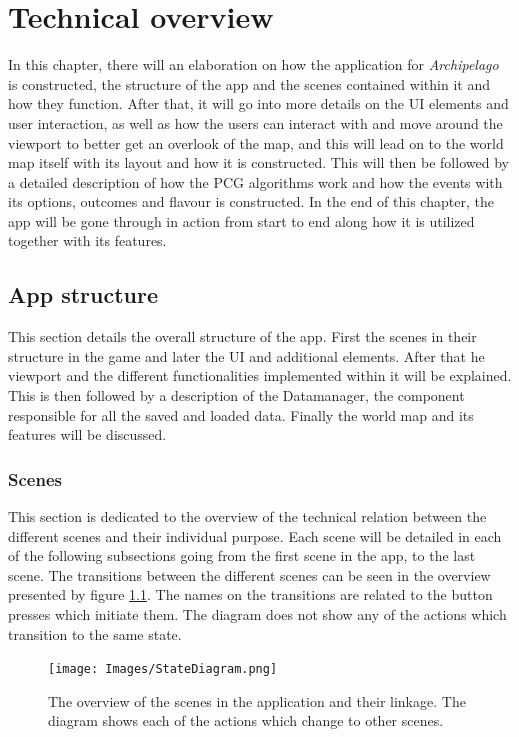 \chapter{Technical overview}
\label{sec:tech}
In this chapter, there will an elaboration on how the application for \textit{Archipelago} is constructed, the structure of the app and the scenes contained within it and how they function. After that, it will go into more details on the UI elements and user interaction, as well as how the users can interact with and move around the viewport to better get an overlook of the map, and this will lead on to the world map itself with its layout and how it is constructed. This will then be followed by a detailed description of how the PCG algorithms work and how the events with its options, outcomes and flavour is constructed. In the end of this chapter, the app will be gone through in action from start to end along how it is utilized together with its features.

\section{App structure}
This section details the overall structure of the app.
First the scenes in their structure in the game and later the UI and additional elements. After that he viewport and the different functionalities implemented within it will be explained. This is then followed by a description of the Datamanager, the component responsible for all the saved and loaded data.
Finally the world map and its features will be discussed.

\subsection{Scenes}
\label{sec:scen}
This section is dedicated to the overview of the technical relation between the different scenes and their individual purpose. Each scene will be detailed in each of the following subsections going from the first scene in the app, to the last scene.
The transitions between the different scenes can be seen in the overview presented by figure \ref{fig:appState}. The names on the transitions are related to the button presses which initiate them. 
The diagram does not show any of the actions which transition to the same state.

\begin{figure}[!ht]
    \centering
    \texttt{[image: Images/StateDiagram.png]}
    \caption{The overview of the scenes in the application and their linkage. The diagram shows each of the actions which change to other scenes.}
    \label{fig:appState}
\end{figure}

